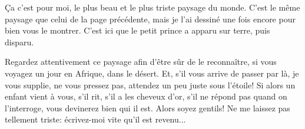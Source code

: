\documentclass[a4paper]{report}
\begin{document}

Ça c'est pour moi, le plus beau et le plus triste paysage du monde. C'est le même paysage que celui de la page précédente, mais je l'ai dessiné une fois encore pour bien vous le montrer. C'est ici que le petit prince a apparu sur terre, puis disparu.

Regardez attentivement ce paysage afin d'être sûr de le reconnaître, si vous voyagez un jour en Afrique, dans le désert. Et, s'il vous arrive de passer par là, je vous supplie, ne vous pressez pas, attendez un peu juste sous l'étoile! Si alors un enfant vient à vous, s'il rit, s'il a les cheveux d'or, s'il ne répond pas quand on l'interroge, vous devinerez bien qui il est. Alors soyez gentils! Ne me laissez pas tellement triste: écrivez-moi vite qu'il est revenu...
\end{document}
